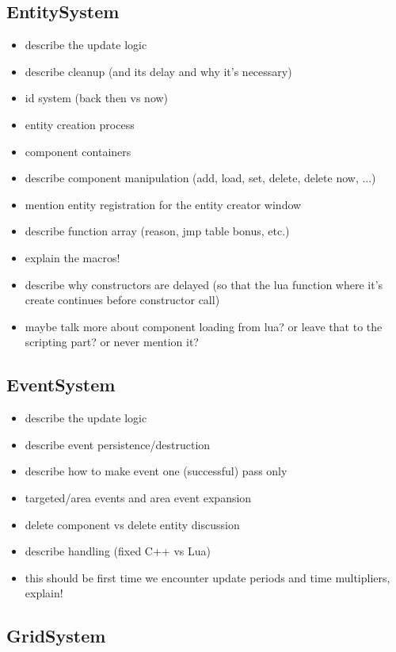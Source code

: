 \subsection{EntitySystem}

\begin{itemize}
    \item describe the update logic
    \item describe cleanup (and its delay and why it's necessary)
    \item id system (back then vs now)
    \item entity creation process
    \item component containers
    \item describe component manipulation (add, load, set, delete, delete now, ...)
    \item mention entity registration for the entity creator window
    \item describe function array (reason, jmp table bonus, etc.)
    \item explain the macros!
    \item describe why constructors are delayed (so that the lua function where it's create continues before constructor call)
    \item maybe talk more about component loading from lua? or leave that to the scripting part? or never mention it?
\end{itemize}

\subsection{EventSystem}

\begin{itemize}
    \item describe the update logic
    \item describe event persistence/destruction
    \item describe how to make event one (successful) pass only
    \item targeted/area events and area event expansion
    \item delete component vs delete entity discussion
    \item describe handling (fixed C++ vs Lua)
    \item this should be first time we encounter update periods and time multipliers, explain!
\end{itemize}

\subsection{GridSystem}

